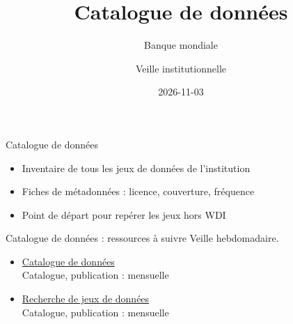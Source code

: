 \documentclass[aspectratio=169,11pt]{beamer}
\title{Catalogue de données}
\subtitle{Banque mondiale}
\author{Veille institutionnelle}
\date{2026-11-03}
\begin{document}
\begin{frame}\titlepage\end{frame}

\begin{frame}{Catalogue de données}
\begin{itemize}
\item Inventaire de tous les jeux de données de l'institution
\item Fiches de métadonnées : licence, couverture, fréquence
\item Point de départ pour repérer les jeux hors WDI
\end{itemize}
\end{frame}

\begin{frame}{Catalogue de données : ressources à suivre}
\small
Veille hebdomadaire.
\begin{itemize}
\item \href{https://datacatalog.worldbank.org}{Catalogue de données}\\{\footnotesize Catalogue, publication : mensuelle}
\item \href{https://datacatalog.worldbank.org/search}{Recherche de jeux de données}\\{\footnotesize Catalogue, publication : mensuelle}
\end{itemize}
\end{frame}
\end{document}
